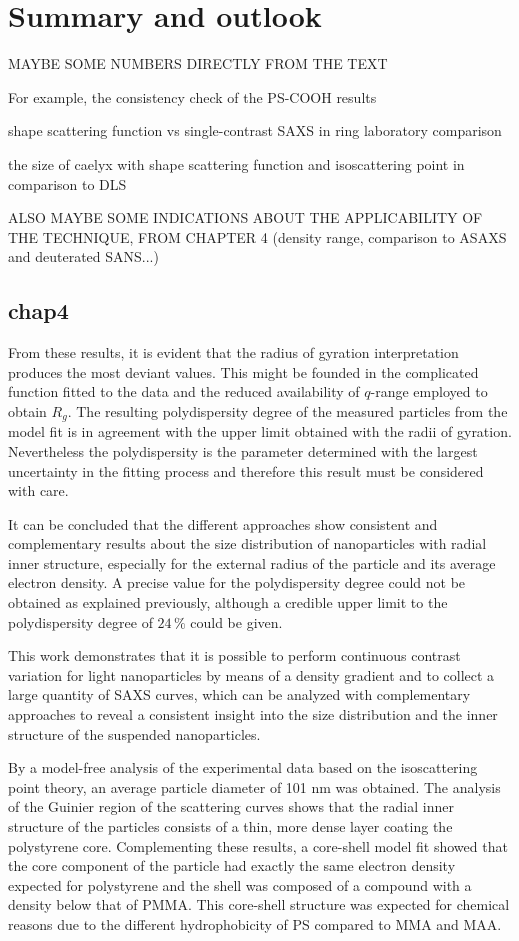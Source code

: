 \chapter{Summary and outlook} 
\label{chap:conclusions}

MAYBE SOME NUMBERS DIRECTLY FROM THE TEXT

For example, the consistency check of the PS-COOH results 

shape scattering function vs single-contrast SAXS in ring laboratory comparison 

the size of caelyx with shape scattering function and isoscattering point in comparison to DLS

ALSO MAYBE SOME INDICATIONS ABOUT THE APPLICABILITY OF THE TECHNIQUE, FROM CHAPTER 4 (density range, comparison to ASAXS and deuterated SANS...)


\section{chap4}

From these results, it is evident that the radius of gyration interpretation produces the most deviant values. This might be founded in the complicated function fitted to the data and the reduced availability of $q$-range employed to obtain \( R_g \). The resulting polydispersity degree of the measured particles from the model fit is in agreement with the upper limit obtained with the radii of gyration. Nevertheless the polydispersity is the parameter determined with the largest uncertainty in the fitting process and therefore this result must be considered with care.

It can be concluded that the different approaches show consistent and complementary results about the size distribution of nanoparticles with radial inner structure, especially for the external radius of the particle and its average electron density. A precise value for the polydispersity degree could not be obtained as explained previously, although a credible upper limit to the polydispersity degree of $24\,\%$ could be given.

This work demonstrates that it is possible to perform continuous contrast variation for light nanoparticles by means of a density gradient and to collect a large quantity of SAXS curves, which can be analyzed with complementary approaches to reveal a consistent insight into the size distribution and the inner structure of the suspended nanoparticles. 

By a model-free analysis of the experimental data based on the isoscattering point theory, an average particle diameter of 101 nm was obtained. The analysis of the Guinier region of the scattering curves shows that the radial inner structure of the particles consists of a thin, more dense layer coating the polystyrene core. Complementing these results, a core-shell model fit showed that the core component of the particle had exactly the same electron density expected for polystyrene and the shell was composed of a compound with a density below that of PMMA. This core-shell structure was expected for chemical reasons due to the different hydrophobicity of PS compared to MMA and MAA.

